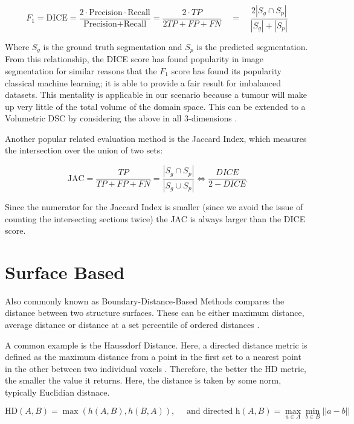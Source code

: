 \documentclass[11pt,twoside]{report}
\begin{document}
\begin{equation*}
  F_1 = \text{DICE} = \frac{2 \cdot \text{Precision} \cdot \text{Recall}} {\text{Precision} + \text{Recall}} = \frac{2 \cdot TP}{2TP + FP + FN} \quad = \quad \frac{2|S_g\cap S_p|}{|S_g|+|S_p|}
\end{equation*}

Where $S_g$ is the ground truth segmentation and $S_p$ is the predicted segmentation. From this relationship, the DICE score has found popularity in image segmentation for similar reasons that the $F_1$ score has found its popularity classical machine learning; it is able to provide a fair result for imbalanced datasets. This mentality is applicable in our scenario because a tumour will make up very little of the total volume of the domain space. This can be extended to a Volumetric DSC by considering the above in all 3-dimensions \cite{APL}.

Another popular related evaluation method is the Jaccard Index, which measures the intersection over the union of two sets:

\begin{equation*}
  \text{JAC} = \frac{TP}{TP+FP+FN} = \frac{|S_g\cap S_p|}{|S_g \cup S_p|} \iff \frac{DICE}{2 - DICE}
\end{equation*}

Since the numerator for the Jaccard Index is smaller (since we avoid the issue of counting the intersecting sections twice) the JAC is always larger than the DICE score.

\section{Surface Based} \label{sect:surface-based}

Also commonly known as Boundary-Distance-Based Methods \cite{boundary-overlap-metrics} compares the distance between two structure
surfaces. These can be either maximum distance, average distance or distance at a set percentile of ordered distances \cite{evaluation-metrics}.

A common example is the Haussdorf Distance. Here, a directed distance metric is defined as the maximum distance from a point in the first set to a nearest point in the other between two individual voxels \cite{boundary-overlap-metrics}. Therefore, the better the HD metric, the smaller the value it returns. Here, the distance is taken by some norm, typically Euclidian distnace.

\begin{equation*}
  \text{HD}(A,B) = \max(h(A,B), h(B,A)), \quad \text{ and directed h}(A,B)=\max_{a\in A}\min_{b \in B} ||a-b||
\end{equation*}
\end{document}
